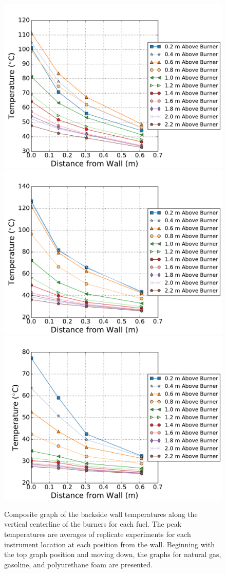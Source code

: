 \documentclass[twoside]{uocthesis}
\begin{document}
{\begin{figure}[p]
	\centering
	\includegraphics[width=.6\columnwidth]{../Figures/NCTW_NG_TC_Back_Center_Avg}\\
	\includegraphics[width=.6\columnwidth]{../Figures/NCTW_GAS_TC_Back_Center_Avg}\\
	\includegraphics[width=.6\columnwidth]{../Figures/NCTW_PUF_TC_Back_Center_Avg}\\
	\caption[Composite graph of the backside wall temperatures along the center of the burners]{Composite graph of the backside wall temperatures along the vertical centerline of the burners for each fuel. The peak temperatures are averages of replicate experiments for each instrument location at each position from the wall. Beginning with the top graph position and moving down, the graphs for natural gas, gasoline, and polyurethane foam are presented.}
	\label{NCTW_Back_Cent_comp}
\end{figure}


}
\end{document}

